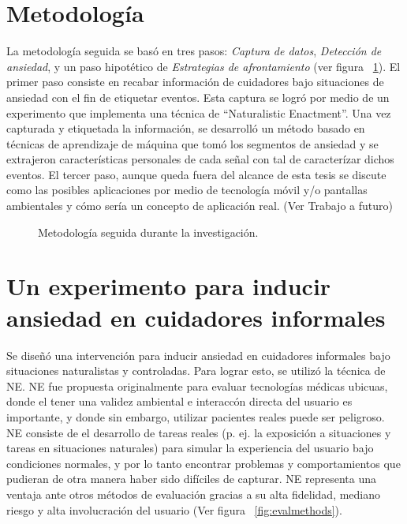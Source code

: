 \section{Metodolog\'ia}\label{secc:methodology}
La metodolog\'ia seguida se bas\'o en tres pasos: \textit{Captura de datos}, \textit{Detecci\'on de ansiedad}, y un paso hipot\'etico de \textit{Estrategias de afrontamiento} (ver figura ~\ref{fig:metodology}). El primer paso consiste en recabar informaci\'on de cuidadores bajo situaciones de ansiedad con el fin de etiquetar eventos. Esta captura se logr\'o por medio de un experimento que implementa una t\'ecnica de ``Naturalistic Enactment''. Una vez capturada y etiquetada la informaci\'on, se desarroll\'o un m\'etodo basado en t\'ecnicas de aprendizaje de m\'aquina que tom\'o los segmentos de ansiedad y se extrajeron caracter\'isticas personales de cada se\~nal con tal de caracter\'izar dichos eventos. El tercer paso, aunque queda fuera del alcance de esta tesis se discute como las posibles aplicaciones por medio de tecnolog\'ia m\'ovil y/o pantallas ambientales y c\'omo ser\'ia un concepto de aplicaci\'on real. (Ver Trabajo a futuro)
\begin{figure}[h]
        \centering
        \caption{Metodolog\'ia seguida durante la investigaci\'on.} \label{fig:metodology}
\end{figure}

\section{Un experimento para inducir ansiedad en cuidadores informales}\label{secc:experiment}
Se dise\~n\'o una intervenci\'on para inducir ansiedad en cuidadores informales bajo situaciones naturalistas y controladas. Para lograr esto, se utiliz\'o la t\'ecnica de NE. NE fue propuesta originalmente para evaluar tecnolog\'ias m\'edicas ubicuas, donde el tener una validez ambiental e interacc\'on directa del usuario es importante, y donde sin embargo, utilizar pacientes reales puede ser peligroso\citep{Castro11}. NE consiste de el desarrollo de tareas reales (p. ej. la exposici\'on a situaciones y tareas en situaciones naturales) para simular la experiencia del usuario bajo condiciones normales, y por lo tanto encontrar problemas y comportamientos que pudieran de otra manera haber sido dif\'iciles de capturar. NE representa una ventaja ante otros m\'etodos de evaluaci\'on gracias a su alta fidelidad, mediano riesgo y alta involucraci\'on del usuario (Ver figura ~\ref{fig:evalmethods}).

